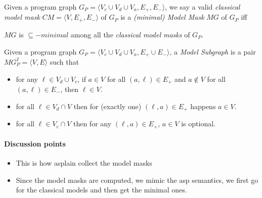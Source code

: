 \begin{definition}
  Given a program graph $G_P = \langle V_c \cup V_d \cup V_a, E_{+}, E_{-} \rangle$,
  we say a valid \emph{classical model mask} $CM = \langle V, E_{+}, E_{-} \rangle$ of $G_P$
  is a \emph{(minimal) Model Mask} $MG$ of $G_P$
  iff
  \begin{center}
    $MG$ is $\subseteq-minimal$ among all the \emph{classical model masks} of $G_P$.
  \end{center}
\end{definition}


\begin{definition}
  Given a program graph $G_P = \langle V_c \cup V_d \cup V_a, E_{+} \cup E_{-} \rangle$,
  a \emph{Model Subgraph} is a pair $MG_P^I = \langle V, E \rangle$ such that
  \begin{itemize}
    \item for any $\ell\in V_d\cup V_c$,
    if $a\in V$ for all $(a, \ell) \in E_{+}$
    and $a\not\in V$ for all $(a, \ell) \in E_{-}$,
    then $\ell \in V$.

    \item for all $\ell\in V_d\cap V$ then for (exactly one) $(\ell,a) \in E_{+}$ happens $a\in V$.

    \item for all $\ell\in V_c\cap V$ then for any $(\ell,a) \in E_{+}$, $a\in V$ is optional.


  \end{itemize}
\end{definition}


\paragraph{Discussion points}
\begin{itemize}
  \item This is how asplain collect the model masks
  \item Since the model masks are computed, we mimic the asp semantics, we first go for the classical models and then get the minimal ones.
\end{itemize}



